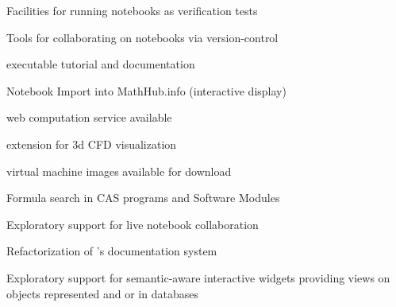 \begin{workpackage}
\begin{wpdelivs}
  \begin{wpdeliv}[due=18,id=jupyter-test,dissem=PU,nature=O]
      {Facilities for running notebooks as verification tests}
  \end{wpdeliv}

  \begin{wpdeliv}[due=12,id=jupyter-collab,dissem=PU,nature=O]
      {Tools for collaborating on notebooks via version-control}
  \end{wpdeliv}
    \begin{wpdeliv}[due=21,id=oommf-nb-documentation,dissem=PU,nature=DEC,lead=USO]
      {\OOMMFNB{} executable tutorial and documentation}
    \end{wpdeliv}
    \begin{wpdeliv}[id=jupyter-import,due=24,nature=DEM,dissem=PU]
      {Notebook Import into MathHub.info (interactive display)}
    \end{wpdeliv}
    \begin{wpdeliv}[due=24,id=oommf-nb-tmp,dissem=PU,nature=DEC,lead=USO]
      {\OOMMFNB{} web computation service available}
    \end{wpdeliv}

  \begin{wpdeliv}[due=24,id=cfd-vis,dissem=PU,nature=O]
      {\Jupyter extension for 3d CFD visualization}
  \end{wpdeliv}

    \begin{wpdeliv}[due=24,id=oommf-nb-virtual,dissem=PU,nature=O, lead=USO]
      {\OOMMFNB{} virtual machine images available for download}
    \end{wpdeliv}

    \begin{wpdeliv}[id=cassearch,due=30,nature=O,dissem=PU]
      {Formula search in CAS programs and Software Modules}
    \end{wpdeliv}

  \begin{wpdeliv}[due=36,id=jupyter-live-collab,dissem=PU,nature=O]
      {Exploratory support for live notebook collaboration}
  \end{wpdeliv}

  \begin{wpdeliv}[due=24,id=sage-sphinx,dissem=PU,nature=O]
      {Refactorization of \Sage's \Sphinx documentation system}
  \end{wpdeliv}

  \begin{wpdeliv}[due=36,id=ipython-advanced-interacts,dissem=PU,nature=DEM]
      {Exploratory support for semantic-aware interactive widgets providing views on objects
      represented and or in databases}
  \end{wpdeliv}


\end{wpdelivs}
\end{workpackage}
